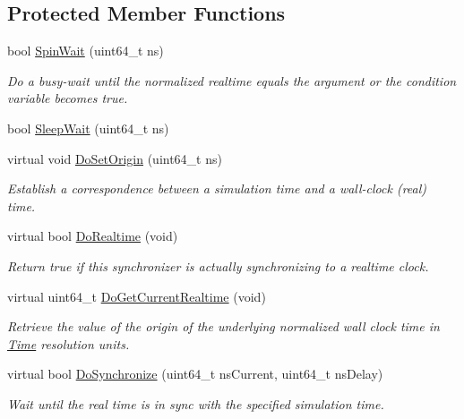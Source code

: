 \subsection*{Protected Member Functions}
\begin{DoxyCompactItemize}
\item 
bool \hyperlink{classns3_1_1WallClockSynchronizer_aa236882980f6c82e0e7f716e670e5c1f}{Spin\+Wait} (uint64\+\_\+t ns)
\begin{DoxyCompactList}\small\item\em Do a busy-\/wait until the normalized realtime equals the argument or the condition variable becomes {\ttfamily true}. \end{DoxyCompactList}\item 
bool \hyperlink{classns3_1_1WallClockSynchronizer_a1adbfec497fb2868e685759e60ca1b4d}{Sleep\+Wait} (uint64\+\_\+t ns)
\item 
virtual void \hyperlink{classns3_1_1WallClockSynchronizer_a02506cfe3b04fc38adf900dde5785d49}{Do\+Set\+Origin} (uint64\+\_\+t ns)
\begin{DoxyCompactList}\small\item\em Establish a correspondence between a simulation time and a wall-\/clock (real) time. \end{DoxyCompactList}\item 
virtual bool \hyperlink{classns3_1_1WallClockSynchronizer_a4a75644fa029e990a955d2e681fc9784}{Do\+Realtime} (void)
\begin{DoxyCompactList}\small\item\em Return {\ttfamily true} if this synchronizer is actually synchronizing to a realtime clock. \end{DoxyCompactList}\item 
virtual uint64\+\_\+t \hyperlink{classns3_1_1WallClockSynchronizer_a8cf87080dc50fa9713ae182bfdd3155e}{Do\+Get\+Current\+Realtime} (void)
\begin{DoxyCompactList}\small\item\em Retrieve the value of the origin of the underlying normalized wall clock time in \hyperlink{classns3_1_1Time}{Time} resolution units. \end{DoxyCompactList}\item 
virtual bool \hyperlink{classns3_1_1WallClockSynchronizer_a2239c8d81f229d97bf4a3585031fb5ea}{Do\+Synchronize} (uint64\+\_\+t ns\+Current, uint64\+\_\+t ns\+Delay)
\begin{DoxyCompactList}\small\item\em Wait until the real time is in sync with the specified simulation time. \end{DoxyCompactList}\item 

\end{DoxyCompactItemize}
